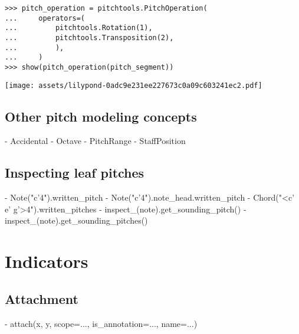 \begin{abjadbookoutput}
\begin{singlespacing}
\vspace{-0.5\baselineskip}
\begin{lstlisting}
>>> pitch_operation = pitchtools.PitchOperation(
...     operators=(
...         pitchtools.Rotation(1),
...         pitchtools.Transposition(2),
...         ),
...     )
>>> show(pitch_operation(pitch_segment))
\end{lstlisting}
\noindent\texttt{[image: assets/lilypond-0adc9e231ee227673c0a09c603241ec2.pdf]}
\end{singlespacing}
\end{abjadbookoutput}

\subsection{Other pitch modeling concepts}

\begin{markdown}
-   Accidental
-   Octave
-   PitchRange
-   StaffPosition
\end{markdown}

\subsection{Inspecting leaf pitches}

\begin{markdown}
-   Note("c'4").written_pitch
-   Note("c'4").note_head.written_pitch
-   Chord("<c' e' g'>4").written_pitches
-   inspect_(note).get_sounding_pitch()
-   inspect_(note).get_sounding_pitches()
\end{markdown}

\section{Indicators}

\subsection{Attachment}

\begin{markdown}
-   attach(x, y, scope=..., is_annotation=..., name=...)
\end{markdown}

